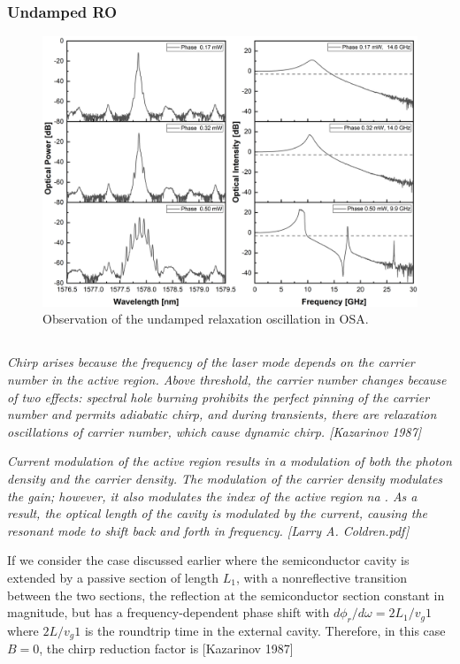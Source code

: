 \subsubsection{Undamped RO}
\begin{figure}[!htb]
    \centering
    \includegraphics[width=\linewidth]{figures/Umdamped_RO_and_bandwidth_grating_4621.png}
    \caption{Observation of the undamped relaxation oscillation in OSA.}
    \label{fig:undamped_RO}
\end{figure}

\subsection{}
\textit{Chirp arises because the frequency of the laser mode depends on the carrier number in the active region. Above threshold, the carrier number changes because of two effects: spectral hole burning prohibits the perfect pinning of the carrier number and permits adiabatic chirp, and during transients, there are relaxation oscillations of carrier number, which cause dynamic chirp. [Kazarinov 1987]}

\textit{Current modulation of the active region results in a modulation of both the photon density and the carrier density. The modulation of the carrier density modulates the gain; however, it also modulates the index of the active region na . As a result, the optical length of the cavity is modulated by the current, causing the resonant mode to shift back and forth in frequency. [Larry A. Coldren.pdf]}

If we consider the case discussed earlier where the semiconductor cavity is extended by a passive section of length $L_1$, with a nonreflective transition between the two sections, the reflection at the semiconductor section constant in magnitude, but has a frequency-dependent phase shift with $d\phi_r/d\omega = 2L_1/v_g1$ where $2L/v_g1$ is the roundtrip time in the external cavity. Therefore, in this case $B=0$, the chirp reduction factor is [Kazarinov 1987]



